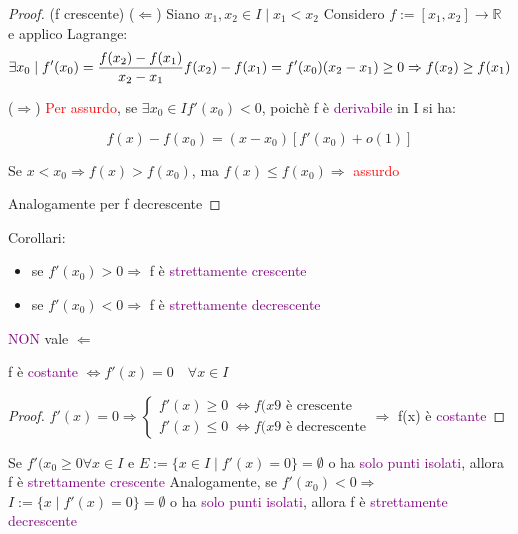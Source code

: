 \documentclass{article}
\begin{document}
\begin{proof}
(f crescente)
    ($\Leftarrow$) 
    Siano $x_1, x_2 \in I \mid x_1 < x_2$
    Considero $f:=[x_1,x_2] \to \mathbb{R}$ e applico Lagrange: 
    \[\exists x_0 \mid f'(x_0)= \frac{f(x_2)-f(x_1)}{x_2 -x_1} \\ f(x_2) -f(x_1) = f'(x_0) (x_2-x_1) \ge 0 \Rightarrow f(x_2) \ge f(x_1) \]

    
    ($\Rightarrow$) 
    \textcolor{red}{Per assurdo}, se $ \exists x_0 \in I f'(x_0) < 0$, 
    poichè f è \textcolor{purple}{derivabile} in I si ha: 
    

    \[f(x)- f(x_0) =   (x - x_0)[f'(x_0) + o(1)] \]

    Se $x < x_0 \Rightarrow f(x) > f(x_0) $, ma $f(x) \le f(x_0) \Rightarrow$ \textcolor{red}{assurdo}

    Analogamente per f decrescente
    
\end{proof}
    Corollari: 
\begin{tcolorbox}[colback=white, colframe=purple]
\begin{itemize}
    \item se $f'(x_0)>0 \Rightarrow $ f è \textcolor{purple}{strettamente crescente}
    \item se $f'(x_0)<0 \Rightarrow $ f è \textcolor{purple}{strettamente decrescente}
\end{itemize}

\end{tcolorbox}
\textcolor{purple}{NON} vale $\Leftarrow$


\begin{tcolorbox}[colback=white, colframe=purple]
f è \textcolor{purple}{costante} $ \Leftrightarrow f'(x)=0 \quad \forall x \in I $
\end{tcolorbox}
\begin{proof}
    \begin{math} f'(x)=0 \Rightarrow
        \begin{cases}
            f'(x) \ge 0 \; \Leftrightarrow f(x9 \text{ è crescente} \\
            f'(x) \le 0 \; \Leftrightarrow f(x9 \text{ è decrescente}
        \end{cases} \Rightarrow
    \end{math}
    f(x) è \textcolor{purple}{costante}
\end{proof}

\begin{tcolorbox}[colback=white, colframe=purple]
    Se $f'(x_0 \ge 0 \forall x \in I$ e $E:=\{x \in I\mid f'(x)=0 \} = \emptyset $ o ha \textcolor{purple}{solo punti isolati}, allora f è \textcolor{purple}{strettamente crescente}
Analogamente, se $f'(x_0)<0 \Rightarrow $ $I:=\{x \mid f'(x)=0 \} = \emptyset $ o ha \textcolor{purple}{solo punti isolati}, allora f è \textcolor{purple}{strettamente decrescente}  
\end{tcolorbox}
\end{document}
